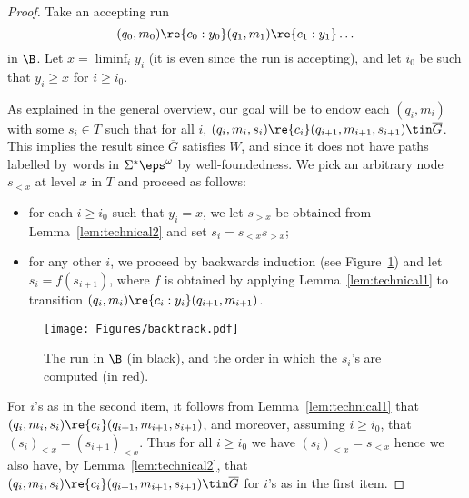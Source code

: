 \begin{proof}
    Take an accepting run
    \[
        (q_0,m_0) \re{c_0:y_0} (q_1,m_1) \re{c_1:y_1} \dots
    \]
    in $\B$.
    Let $x=\liminf_i y_i$ (it is even since the run is accepting), and let $i_0$ be such that $y_i \geq x$ for $i \geq i_0$.

    As explained in the general overview, our goal will be to endow each $(q_i,m_i)$ with some $s_i \in T$ such that for all $i$, $(q_i,m_i,s_i) \re{c_i} (q_{i+1},m_{i+1},s_{i+1}) \tin \overline G$.
    This implies the result since $\overline G$ satisfies $W$, and since it does not have paths labelled by words in $\Sigma^* \eps^\omega$ by well-foundedness.
    We pick an arbitrary node $s_{< x}$ at level $x$ in $T$ and proceed as follows:
    \begin{itemize}
        \item for each $i\geq i_0$ such that $y_i = x$, we let $s_{> x}$ be obtained from Lemma~\ref{lem:technical2} and set $s_i = s_{< x} s_{> x}$;
        \item for any other $i$, we proceed by backwards induction (see Figure~\ref{fig:backtrack}) and let $s_i=f(s_{i+1})$, where $f$ is obtained by applying Lemma~\ref{lem:technical1} to transition $(q_i,m_i) \re{c_i:y_i} (q_{i+1},m_{i+1})$.
    \end{itemize}

    \begin{figure}[h]
        \begin{center}
            \texttt{[image: Figures/backtrack.pdf]}
        \end{center}
        \caption{The run in $\B$ (in black), and the order in which the $s_i$'s are computed (in red).}\label{fig:backtrack}
    \end{figure}

    For $i$'s as in the second item, it follows from Lemma~\ref{lem:technical1} that $(q_i,m_i,s_i) \re{c_i} (q_{i+1},m_{i+1},s_{i+1})$, and moreover, assuming $i \geq i_0$, that $(s_i)_{< x} = (s_{i+1})_{< x}$.
    Thus for all $i \geq i_0$ we have $(s_i)_{< x} = s_{< x}$ hence we also have, by Lemma~\ref{lem:technical2}, that $(q_i,m_i,s_i) \re{c_i} (q_{i+1},m_{i+1},s_{i+1}) \tin \overline G$ for $i$'s as in the first item. 
\end{proof}


